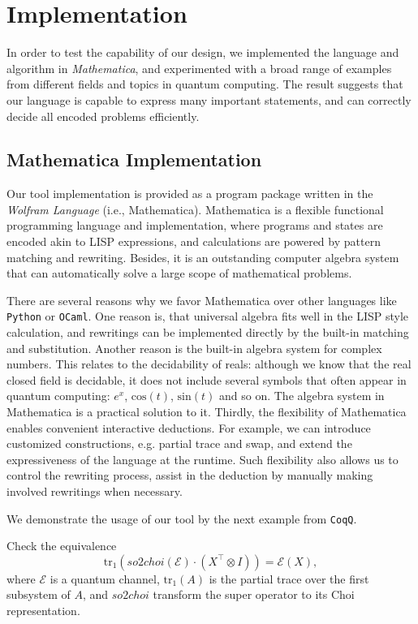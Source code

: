 
\section{Implementation}

In order to test the capability of our design, we implemented the language and algorithm in \textit{Mathematica}, and experimented with a broad range of examples from different fields and topics in quantum computing. The result suggests that our language is capable to express many important statements, and can correctly decide all encoded problems efficiently.

\subsection{Mathematica Implementation}
Our tool implementation is provided as a program package written in the \textit{Wolfram Language} (i.e., Mathematica). 
Mathematica is a flexible functional programming language and implementation, where programs and states are encoded akin to LISP expressions, and calculations are powered by pattern matching and rewriting. Besides, it is an outstanding computer algebra system that can automatically solve a large scope of mathematical problems.

There are several reasons why we favor Mathematica over other languages like \texttt{Python} or \texttt{OCaml}.
One reason is, that universal algebra fits well in the LISP style calculation, and rewritings can be implemented directly by the built-in matching and substitution.
Another reason is the built-in algebra system for complex numbers. This relates to the decidability of reals: although we know that the real closed field is decidable, it does not include several symbols that often appear in quantum computing: $e^x$, $\mathrm{cos}(t)$, $\mathrm{sin}(t)$ and so on. The algebra system in Mathematica is a practical solution to it.
Thirdly, the flexibility of Mathematica enables convenient interactive deductions. For example, we can introduce customized constructions, e.g. partial trace and swap, and extend the expressiveness of the language at the runtime. Such flexibility also allows us to control the rewriting process, assist in the deduction by manually making involved rewritings when necessary.

We demonstrate the usage of our tool by the next example from \texttt{CoqQ}.

\begin{example}
  \label{ex: MMA}
Check the equivalence
  \[
    \mathrm{tr}_1(so2choi(\mathcal{E}) \cdot (X^\top \otimes I)) = \mathcal{E}(X),
  \]
where $\mathcal{E}$ is a quantum channel, $\mathrm{tr}_1(A)$ is the partial trace over the first subsystem of $A$, and $so2choi$ transform the super operator to its Choi representation.
\end{example}

